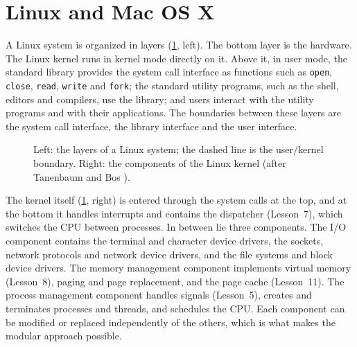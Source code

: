 \documentclass[../main.tex]{subfiles}
\begin{document}
\section{Linux and Mac OS X}
\label{sec:l01-linux-macos}

A Linux system is organized in layers (\cref{fig:l01-linux},
left).  The bottom layer
is the hardware.  The Linux kernel runs in kernel mode directly on it.  Above it, in user mode, the
standard library provides the system call interface as functions such as
\texttt{open}, \texttt{close}, \texttt{read}, \texttt{write} and
\texttt{fork}; the standard utility programs, such as the shell,
editors and compilers, use the library; and users interact with the utility
programs and with their applications.  The boundaries between these layers
are the system call interface, the library interface and the user
interface.

\begin{figure}[htbp]
  \centering
  
  \caption{Left: the layers of a Linux system; the dashed line is the
    user/kernel boundary.  Right: the components of the Linux kernel
    (after Tanenbaum and Bos \cite{tanenbaum2015}).}
  \label{fig:l01-linux}
\end{figure}

The kernel itself (\cref{fig:l01-linux}, right) is entered through the
system calls at the top, and at the bottom it handles interrupts and
contains the dispatcher (Lesson~7), which switches the CPU between
processes.  In
between lie three components.  The I/O component contains the terminal
and character device drivers, the sockets, network protocols and network
device drivers, and the file systems and block device drivers.  The memory
management component implements virtual memory (Lesson~8), paging and
page replacement, and the page cache (Lesson~11).  The process management
component handles signals (Lesson~5), creates and terminates processes and threads, and schedules the
CPU.  Each component can be modified or replaced independently of the
others, which is what makes the modular approach possible.
\end{document}
